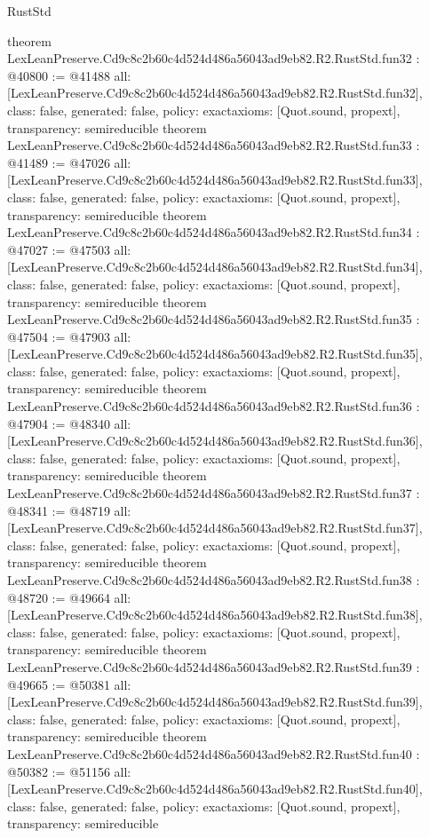 \begin{lexlean}{RustStd}
\begin{coremodule}
{}
theorem LexLeanPreserve.Cd9c8c2b60c4d524d486a56043ad9eb82.R2.RustStd.fun32 : @40800 := @41488 {
  all: [LexLeanPreserve.Cd9c8c2b60c4d524d486a56043ad9eb82.R2.RustStd.fun32],
  class: false,
  generated: false,
  policy: exact{axioms: [Quot.sound, propext]},
  transparency: semireducible
}
theorem LexLeanPreserve.Cd9c8c2b60c4d524d486a56043ad9eb82.R2.RustStd.fun33 : @41489 := @47026 {
  all: [LexLeanPreserve.Cd9c8c2b60c4d524d486a56043ad9eb82.R2.RustStd.fun33],
  class: false,
  generated: false,
  policy: exact{axioms: [Quot.sound, propext]},
  transparency: semireducible
}
theorem LexLeanPreserve.Cd9c8c2b60c4d524d486a56043ad9eb82.R2.RustStd.fun34 : @47027 := @47503 {
  all: [LexLeanPreserve.Cd9c8c2b60c4d524d486a56043ad9eb82.R2.RustStd.fun34],
  class: false,
  generated: false,
  policy: exact{axioms: [Quot.sound, propext]},
  transparency: semireducible
}
theorem LexLeanPreserve.Cd9c8c2b60c4d524d486a56043ad9eb82.R2.RustStd.fun35 : @47504 := @47903 {
  all: [LexLeanPreserve.Cd9c8c2b60c4d524d486a56043ad9eb82.R2.RustStd.fun35],
  class: false,
  generated: false,
  policy: exact{axioms: [Quot.sound, propext]},
  transparency: semireducible
}
theorem LexLeanPreserve.Cd9c8c2b60c4d524d486a56043ad9eb82.R2.RustStd.fun36 : @47904 := @48340 {
  all: [LexLeanPreserve.Cd9c8c2b60c4d524d486a56043ad9eb82.R2.RustStd.fun36],
  class: false,
  generated: false,
  policy: exact{axioms: [Quot.sound, propext]},
  transparency: semireducible
}
theorem LexLeanPreserve.Cd9c8c2b60c4d524d486a56043ad9eb82.R2.RustStd.fun37 : @48341 := @48719 {
  all: [LexLeanPreserve.Cd9c8c2b60c4d524d486a56043ad9eb82.R2.RustStd.fun37],
  class: false,
  generated: false,
  policy: exact{axioms: [Quot.sound, propext]},
  transparency: semireducible
}
theorem LexLeanPreserve.Cd9c8c2b60c4d524d486a56043ad9eb82.R2.RustStd.fun38 : @48720 := @49664 {
  all: [LexLeanPreserve.Cd9c8c2b60c4d524d486a56043ad9eb82.R2.RustStd.fun38],
  class: false,
  generated: false,
  policy: exact{axioms: [Quot.sound, propext]},
  transparency: semireducible
}
theorem LexLeanPreserve.Cd9c8c2b60c4d524d486a56043ad9eb82.R2.RustStd.fun39 : @49665 := @50381 {
  all: [LexLeanPreserve.Cd9c8c2b60c4d524d486a56043ad9eb82.R2.RustStd.fun39],
  class: false,
  generated: false,
  policy: exact{axioms: [Quot.sound, propext]},
  transparency: semireducible
}
theorem LexLeanPreserve.Cd9c8c2b60c4d524d486a56043ad9eb82.R2.RustStd.fun40 : @50382 := @51156 {
  all: [LexLeanPreserve.Cd9c8c2b60c4d524d486a56043ad9eb82.R2.RustStd.fun40],
  class: false,
  generated: false,
  policy: exact{axioms: [Quot.sound, propext]},
  transparency: semireducible
}
\end{coremodule}
\end{lexlean}
